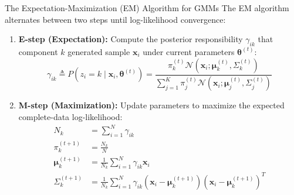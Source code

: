 \begin{theorembox}{The Expectation-Maximization (EM) Algorithm for GMMs}
The EM algorithm alternates between two steps until log-likelihood convergence:
\begin{enumerate}
    \item \textbf{E-step (Expectation):} Compute the posterior responsibility $\gamma_{ik}$ that component $k$ generated sample $\mathbf{x}_i$ under current parameters $\boldsymbol{\theta}^{(t)}$:
    \begin{equation}
    \gamma_{ik} \triangleq P(z_i = k \mid \mathbf{x}_i, \boldsymbol{\theta}^{(t)}) = \frac{\pi_k^{(t)} \mathcal{N}(\mathbf{x}_i; \boldsymbol{\mu}_k^{(t)}, \Sigma_k^{(t)})}{\sum_{j=1}^K \pi_j^{(t)} \mathcal{N}(\mathbf{x}_i; \boldsymbol{\mu}_j^{(t)}, \Sigma_j^{(t)})}
    \label{eq:em_estep}
    \end{equation}
    \item \textbf{M-step (Maximization):} Update parameters to maximize the expected complete-data log-likelihood:
    \begin{align}
    N_k &= \sum_{i=1}^N \gamma_{ik} \label{eq:em_nk} \\
    \pi_k^{(t+1)} &= \frac{N_k}{N} \label{eq:em_pi} \\
    \boldsymbol{\mu}_k^{(t+1)} &= \frac{1}{N_k} \sum_{i=1}^N \gamma_{ik} \mathbf{x}_i \label{eq:em_mu} \\
    \Sigma_k^{(t+1)} &= \frac{1}{N_k} \sum_{i=1}^N \gamma_{ik} (\mathbf{x}_i - \boldsymbol{\mu}_k^{(t+1)})(\mathbf{x}_i - \boldsymbol{\mu}_k^{(t+1)})^T \label{eq:em_sigma}
    \end{align}
\end{enumerate}
\end{theorembox}

